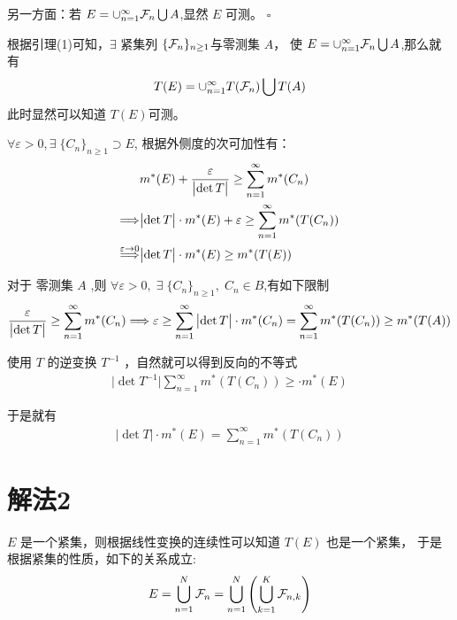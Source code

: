 \documentclass[12pt]{article}
\begin{document}
另一方面：若 $E = \cup_{n=1}^{\infty}\mathcal{F}_n\bigcup A$,显然 $E$ 可测。
$\square$


根据引理(1)可知，$\exists$ 紧集列 $\{\mathcal{F}_n\}_{n\ge 1}$与零测集 $A$， 
使 $E = \cup_{n=1}^{\infty}{\mathcal{F}_n}\bigcup A$,那么就有
\begin{align}
    T(E) = \cup_{n=1}^\infty{T(\ensuremath{\mathcal{F}}_n)}\bigcup T(A)
\end{align}
此时显然可以知道 $T(E)$可测。


$\forall \varepsilon > 0, \exists\;\{C_n\}_{n\ge 1} \supset E$,
根据外侧度的次可加性有：
\begin{align*}
     & m^*(E) + \frac{\varepsilon}{\bigl|\det T\bigr|} \ge \sum_{n=1}^{\infty}{m^*(C_n)} \\
\Longrightarrow & \bigl|\det T\bigr| \cdot m^*(E) + \varepsilon \ge \sum_{n=1}^{\infty}{m^*(T(C_n))} \\
\mathop{\Longrightarrow}\limits^{\varepsilon \to 0} & \bigl|\det T\bigr| \cdot m^*(E) \ge {m^*(T(E))}
\end{align*}

对于 零测集 $A$ ,则 $\forall \varepsilon > 0,\; \exists\; \{C_n\}_{n\ge 1},\; C_n \in B$,有如下限制 
\begin{align*}
    \frac{\varepsilon}{\bigl|\det T\bigr|} \ge \sum_{n=1}^{\infty}{m^*(C_n)}
    \Longrightarrow \varepsilon \ge \sum_{n=1}^{\infty}{\bigl|\det T\bigr|\cdot m^*(C_n)} 
    = \sum_{n=1}^{\infty}{m^*(T(C_n))}
     \ge m^*(T(A))
\end{align*}

使用 $T$ 的逆变换 $T^{-1}$ ，自然就可以得到反向的不等式
\begin{align*}
    \bigl|\det T^{-1}\bigr| \sum_{n=1}^{\infty}{m^*(T(C_n))} \ge \cdot m^*(E)
\end{align*} 

于是就有
\begin{align*}
    \bigl|\det T\bigr| \cdot m^*(E) = \sum_{n=1}^{\infty}{m^*(T(C_n))}
\end{align*}

\section{解法2}

$E$  是一个紧集，则根据线性变换的连续性可以知道 $T(E)$ 也是一个紧集，
于是根据紧集的性质，如下的关系成立:
\begin{align*}
    E = \bigcup_{n=1}^{N}{\mathcal{F}_n} 
      = \bigcup_{n=1}^{N}{\left(\bigcup_{k=1}^{K}{\mathcal{F}_{n, k}}\right)} 
\end{align*}
\end{document}
